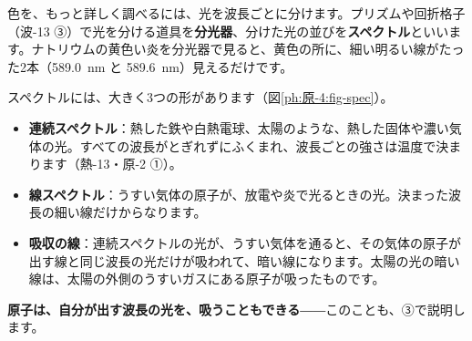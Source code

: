 色を、もっと詳しく調べるには、光を波長ごとに分けます。プリズムや回折格子（波-13 ③）で光を分ける道具を\textbf{分光器}、分けた光の並びを\textbf{スペクトル}といいます。ナトリウムの黄色い炎を分光器で見ると、黄色の所に、細い明るい線がたった2本（\qty{589.0}{nm} と \qty{589.6}{nm}）見えるだけです。

\label{ph:原-4:sec2}
スペクトルには、大きく3つの形があります（図\ref{ph:原-4:fig-spec}）。
\begin{itemize}[leftmargin=1.2\zw, itemsep=2pt, topsep=2pt, label={\color{bkTheme}●}]
\item \textbf{連続スペクトル}：熱した鉄や白熱電球、太陽のような、熱した固体や濃い気体の光。すべての波長がとぎれずにふくまれ、波長ごとの強さは温度で決まります（熱-13・原-2 ①）。
\item \textbf{線スペクトル}：うすい気体の原子が、放電や炎で光るときの光。決まった波長の細い線だけからなります。
\item \textbf{吸収の線}：連続スペクトルの光が、うすい気体を通ると、その気体の原子が出す線と同じ波長の光だけが吸われて、暗い線になります。太陽の光の暗い線は、太陽の外側のうすいガスにある原子が吸ったものです。
\end{itemize}
\textbf{原子は、自分が出す波長の光を、吸うこともできる}――このことも、③で説明します。

